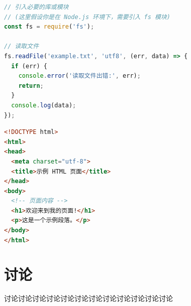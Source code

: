 \documentclass{zjureport}
\begin{document}
\begin{lstlisting}[language=JavaScript]
// 引入必要的库或模块
// (这里假设你是在 Node.js 环境下，需要引入 fs 模块)
const fs = require('fs');

// 读取文件
fs.readFile('example.txt', 'utf8', (err, data) => {
  if (err) {
    console.error('读取文件出错:', err);
    return;
  }
  console.log(data);
});
\end{lstlisting}

\begin{lstlisting}[language=html]
<!DOCTYPE html>
<html>
<head>
  <meta charset="utf-8">
  <title>示例 HTML 页面</title>
</head>
<body>
  <!-- 页面内容 -->
  <h1>欢迎来到我的页面!</h1>
  <p>这是一个示例段落。</p>
</body>
</html>
\end{lstlisting}

\section{讨论}
讨论讨论讨论讨论讨论讨论讨论讨论讨论讨论讨论讨论
\end{document}
